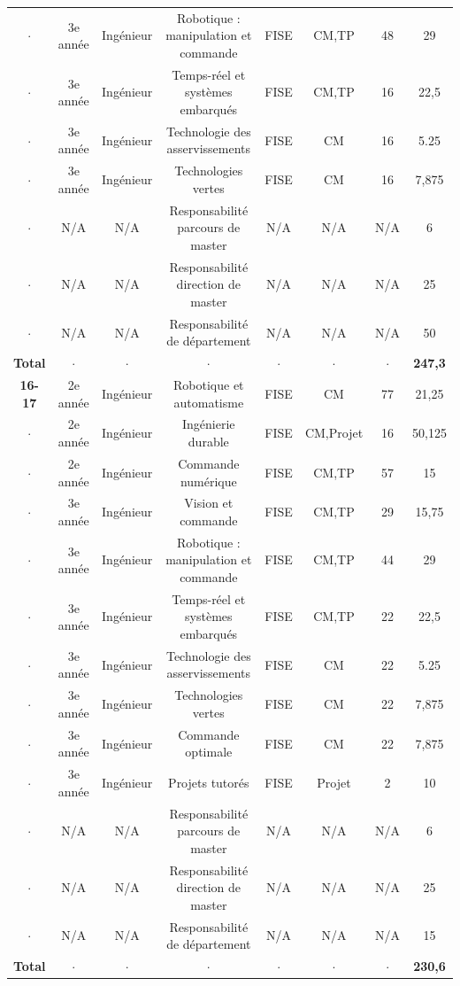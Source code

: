 \documentclass[a4paper,12pt]{article}
\begin{document}
{\begin{tabular}{cccccccc}
  $\cdot$ & 3e année  & Ingénieur & Robotique : manipulation et commande & FISE & CM,TP & 48 & 29  \\
  $\cdot$ & 3e année  & Ingénieur & Temps-réel et systèmes embarqués & FISE & CM,TP & 16 & 22,5  \\
  $\cdot$ & 3e année  & Ingénieur & Technologie des asservissements & FISE & CM & 16 & 5.25  \\
  $\cdot$ & 3e année  & Ingénieur & Technologies vertes & FISE & CM & 16 & 7,875  \\
  $\cdot$ & N/A       & N/A       & Responsabilité parcours de master & N/A & N/A & N/A & 6  \\
  $\cdot$ & N/A       & N/A       & Responsabilité direction de master & N/A & N/A & N/A & 25  \\
  $\cdot$ & N/A       & N/A       & Responsabilité de département & N/A & N/A & N/A & 50  \\
 \bf{Total} & $\cdot$ & $\cdot$ & $\cdot$ & $\cdot$ & $\cdot$ & $\cdot$ &  {\bf 247,3} \\\midrule
  \bf{16-17} & 2e année  & Ingénieur & Robotique et automatisme & FISE & CM & 77 & 21,25 \\
 $\cdot$ & 2e année  & Ingénieur & Ingénierie durable  & FISE & CM,Projet & 16  & 50,125  \\
  $\cdot$ & 2e année  & Ingénieur & Commande numérique  & FISE & CM,TP & 57  & 15  \\
  $\cdot$ & 3e année  & Ingénieur & Vision et commande & FISE & CM,TP & 29 & 15,75  \\
  $\cdot$ & 3e année  & Ingénieur & Robotique : manipulation et commande & FISE & CM,TP & 44 & 29  \\
  $\cdot$ & 3e année  & Ingénieur & Temps-réel et systèmes embarqués & FISE & CM,TP & 22 & 22,5  \\
  $\cdot$ & 3e année  & Ingénieur & Technologie des asservissements & FISE & CM & 22 & 5.25  \\
  $\cdot$ & 3e année  & Ingénieur & Technologies vertes & FISE & CM & 22 & 7,875  \\
  $\cdot$ & 3e année  & Ingénieur & Commande optimale & FISE & CM & 22 & 7,875  \\
  $\cdot$ & 3e année  & Ingénieur & Projets tutorés & FISE & Projet & 2 & 10  \\
  $\cdot$ & N/A       & N/A       & Responsabilité parcours de master & N/A & N/A & N/A & 6  \\
  $\cdot$ & N/A       & N/A       & Responsabilité direction de master & N/A & N/A & N/A & 25  \\
  $\cdot$ & N/A       & N/A       & Responsabilité de département & N/A & N/A & N/A & 15  \\
  \bf{Total} & $\cdot$ & $\cdot$ & $\cdot$ & $\cdot$ & $\cdot$ & $\cdot$ &  {\bf 230,6} \\ \bottomrule
\end{tabular}

}
\end{document}
